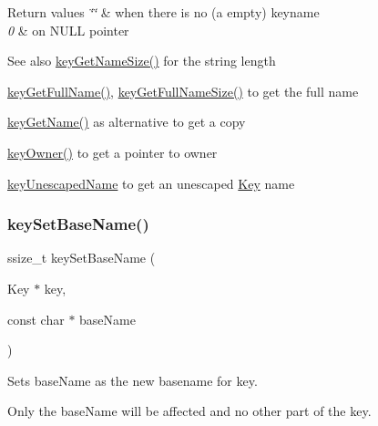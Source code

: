 \begin{DoxyItemize}
\begin{DoxyRetVals}{Return values}
{\em \char`\"{}\char`\"{}} & when there is no (a empty) keyname \\
\hline
{\em 0} & on N\+U\+LL pointer \\
\hline
\end{DoxyRetVals}
\begin{DoxySeeAlso}{See also}
\hyperlink{group__keyname_gabdbcfa51ed8a387e47ead207affa2d2e}{key\+Get\+Name\+Size()} for the string length 

\hyperlink{group__keyname_gaaba1494a5ffc976e0e56c43f4334a23c}{key\+Get\+Full\+Name()}, \hyperlink{group__keyname_gab65dc9d43d3ee08d5e936a20ebbddd23}{key\+Get\+Full\+Name\+Size()} to get the full name 

\hyperlink{group__keyname_gab29a850168d9b31c9529e90cf9ab68be}{key\+Get\+Name()} as alternative to get a copy 

\hyperlink{owner_8c_af6485fb8599714b6bbd830cf915ffea5}{key\+Owner()} to get a pointer to owner 

\hyperlink{group__keyname_ga6fe6af4c27b35d911a533f4ae4d698bb}{key\+Unescaped\+Name} to get an unescaped \hyperlink{group__key}{Key} name 
\end{DoxySeeAlso}

\end{DoxyItemize}\mbox{\label{group__keyname_ga6e804bd453f98c28b0ff51430d1df407}} 
\subsubsection{\texorpdfstring{key\+Set\+Base\+Name()}{keySetBaseName()}}
{\footnotesize\ttfamily ssize\+\_\+t key\+Set\+Base\+Name (\begin{DoxyParamCaption}\item[{Key $\ast$}]{key,  }\item[{const char $\ast$}]{base\+Name }\end{DoxyParamCaption})}



Sets {\ttfamily base\+Name} as the new basename for {\ttfamily key}. 

Only the base\+Name will be affected and no other part of the key.

